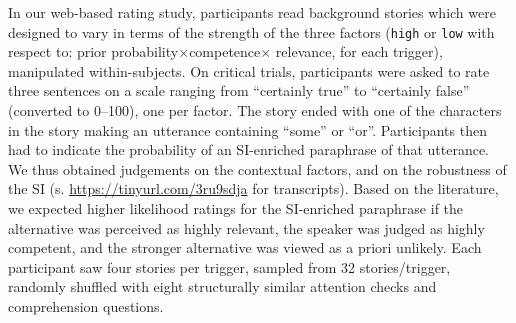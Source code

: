 \documentclass[11pt,letterpaper]{article}
\begin{document}
In our web-based rating study, participants read background stories which were designed to vary in terms of the strength of the three factors (\texttt{high} or \texttt{low} with respect to: prior probability$\times$competence$\times$ relevance, for each trigger), manipulated within-subjects.
On critical trials, participants were asked to rate three sentences on a scale ranging from ``certainly true'' to ``certainly false'' (converted to 0--100), one per factor. 
The story ended with one of the characters in the story making an utterance containing ``some'' or ``or''. Participants then had to indicate the probability of an SI-enriched paraphrase of that utterance. 
We thus obtained judgements on the contextual factors, and on the robustness of the SI (s. \url{https://tinyurl.com/3ru9sdja} for transcripts). 
Based on the literature, we expected higher likelihood ratings for the SI-enriched paraphrase if the alternative was perceived as highly relevant, the speaker was judged as highly competent, and the stronger alternative was viewed as a priori unlikely. Each participant saw four stories per trigger, sampled from 32 stories/trigger, randomly shuffled with eight structurally similar attention checks and comprehension questions.
\end{document}
